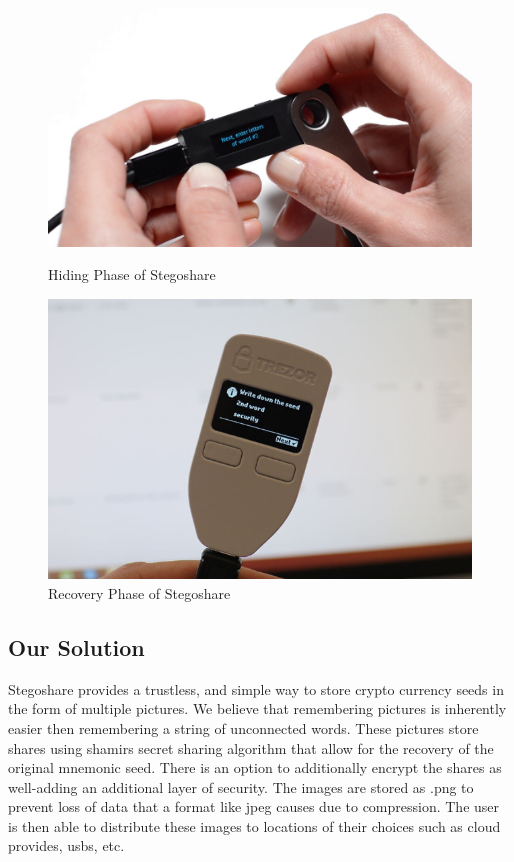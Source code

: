 \begin{figure}[H]
\centering
\begin{minipage}{.5\textwidth}
  \centering
  \includegraphics[scale = 0.15]{ledgerPhrase.jpg}
	\caption{Hiding Phase of Stegoshare}
	\label{fig: Hiding Phas}
\end{minipage}%
\begin{minipage}{.5\textwidth}
  \centering
  \includegraphics[scale = 0.25]{trezorPhrase.jpg}
	\caption{Recovery Phase of Stegoshare}
	\label{fig: Recovery Phas}
\end{minipage}
\end{figure}

\newpage
\subsection{Our Solution}
Stegoshare provides a trustless, and simple way to store crypto currency seeds in the form of multiple pictures. We believe that remembering pictures is inherently easier then remembering
a string of unconnected words. These pictures store shares using shamirs secret sharing algorithm that allow for the recovery of the original mnemonic seed. There is an option to additionally encrypt
the shares as well-adding an additional layer of security. The images are stored as .png to prevent loss of data that a format like jpeg causes due to compression. The user is then able to distribute these
images to locations of their choices such as cloud provides, usbs, etc. 

